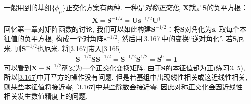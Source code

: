 一般用到的基组$\{\phi_\mu\}$正交化方案有两种. 一种是\emph{对称正交化}, $\mathbf{X}$就是$\mathbf{S}$的负平方根：
\begin{align}\label{3.167}
	\mathbf{X} = \mathbf{S}^{-1/2} = \mathbf{U}\mathbf{s}^{-1/2}\mathbf{U}^\dagger
\end{align}
回忆第一章对矩阵函数的讨论, 
我们可以如此构建$\mathbf{S}^{-1/2}$：将$\mathbf{S}$对角化为$\mathbf{s}$, 
取每个本征值的负平方根, 
构成一个对角阵$\mathbf{s}^{-1/2}$, 
然后用\eqref{3.167}中的变换``逆对角化”. 
若$\mathbf{S}$厄米, 
则$\mathbf{S}^{-1/2}$也厄米. 
将\eqref{3.167}带入\eqref{3.165}
\begin{align}
	\mathbf{S}^{-1/2}\mathbf{SS}^{-1/2} = \mathbf{S}^{-1/2}\mathbf{S}^{1/2} = \mathbf{S}^0 = \mathbf{1}
\end{align} 
可以看到$\mathbf{X=S}^{-1/2}$确实为一个正交化变换矩阵. 
由于$\mathbf{S}$的本征值都为正(练习3.
5), 
所以\eqref{3.167}中开平方的操作没有问题. 
但是若基组中出现线性相关或这近线性相关, 
则某些本征值将接近零, 
\eqref{3.167}中某些除数会接近零. 
因此对称正交化会因近线性相关发生数值精度上的问题.


